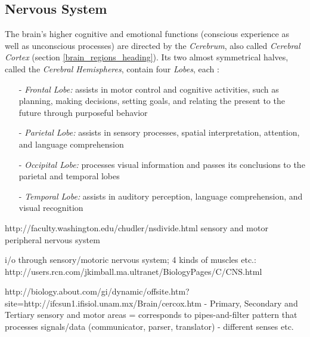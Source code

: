 %
%
%
%
%
%
%

\subsection{Nervous System}
\label{nervous_system_heading}

The brain's higher cognitive and emotional functions (conscious experience as
well as unconscious processes) are directed by the \emph{Cerebrum}, also called
\emph{Cerebral Cortex} (section \ref{brain_regions_heading}). Its two almost
symmetrical halves, called the \emph{Cerebral Hemispheres}, contain four
\emph{Lobes}, each \cite{discoveringpsychology}:

\begin{itemize}
    \item[-] \emph{Frontal Lobe:} assists in motor control and cognitive
        activities, such as planning, making decisions, setting goals, and
        relating the present to the future through purposeful behavior
    \item[-] \emph{Parietal Lobe:} assists in sensory processes, spatial
        interpretation, attention, and language comprehension
    \item[-] \emph{Occipital Lobe:} processes visual information and passes its
        conclusions to the parietal and temporal lobes
    \item[-] \emph{Temporal Lobe:} assists in auditory perception, language
        comprehension, and visual recognition
\end{itemize}

http://faculty.washington.edu/chudler/nsdivide.html
sensory and motor peripheral nervous system

i/o through sensory/motoric nervous system; 4 kinds of muscles etc.:
http://users.rcn.com/jkimball.ma.ultranet/BiologyPages/C/CNS.html

http://biology.about.com/gi/dynamic/offsite.htm?site=http://ifcsun1.ifisiol.unam.mx/Brain/cercox.htm
- Primary, Secondary and Tertiary sensory and motor areas
= corresponds to pipes-and-filter pattern that processes signals/data
(communicator, parser, translator)
- different senses etc.
